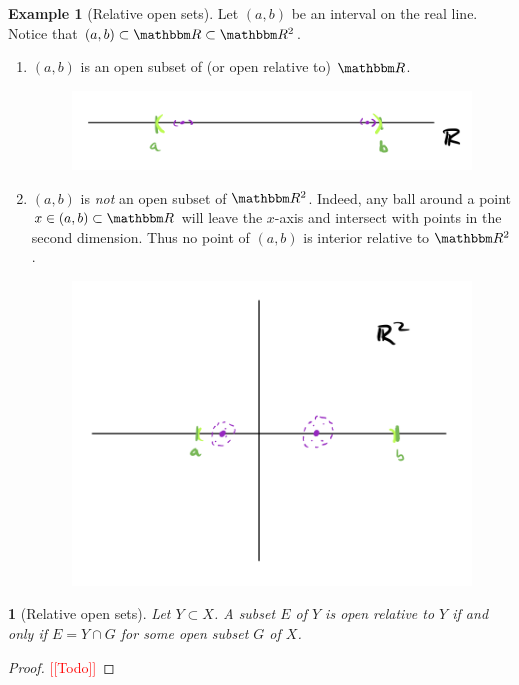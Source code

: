 \documentclass[12pt]{article}
\numberwithin{equation}{section}
\theoremstyle{plain}
\newtheorem{theorem}{\color{ForestGreen}{\textbf{Theorem}}}[section]
\theoremstyle{definition}
\newtheorem{example}{\color{WildStrawberry}Example}[section]
\newcommand{\1}{\mathbbm 1}
\newcommand{\RR}{\mathbbm R}
\begin{document}
\begin{example}[Relative open sets]
	Let $(a,b)$ be an interval on the real line. Notice that $(a,b) \subset \RR \subset \RR^2$.
	\begin{enumerate}
		\item $(a,b)$ is an open subset of (or open relative to) $\RR$.
		\begin{figure}[H]
			\begin{center}
				\includegraphics[scale=.75]{open_relative_r.png}
			\end{center}
		\end{figure}
		\item $(a,b)$ is \emph{not} an open subset of $\RR^2$. Indeed, any ball around a point $x \in (a,b) \subset \RR$ will leave the $x$-axis and intersect with points in the second dimension. Thus no point of $(a,b)$ is interior relative to $\RR^2$.
		\begin{figure}[H]
			\begin{center}
				\includegraphics[scale=.75]{open_relative_r2.png}
			\end{center}
		\end{figure}  
	\end{enumerate}
\end{example}


\begin{theorem}[Relative open sets]
	Let $Y \subset X$. A subset $E$ of $Y$ is open relative to $Y$ if and only if $E = Y \cap G$ for some open subset $G$ of $X$. 
\end{theorem}
\begin{proof}
	\textcolor{red}{[[Todo]]}
\end{proof}
\end{document}
